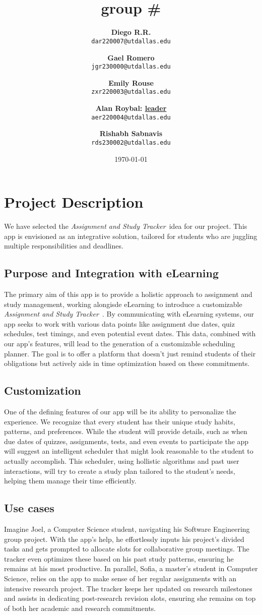 \documentclass[12pt]{article}
\title{\groupname
\\ \small{group} \# \groupnumber}
\author{
    \textbf{Diego R.R.} \\
    \texttt{dar220007@utdallas.edu} \\
    \and 
    \textbf{Gael Romero} \\
    \texttt{jgr230000@utdallas.edu} \\
    \and
    \textbf{Emily Rouse} \\
    \texttt{zxr220003@utdallas.edu} \\
    \and
    \textbf{Alan Roybal: \underline{leader}} \\
    \texttt{aer220004@utdallas.edu} \\
    \and
    \textbf{Rishabh Sabnavis} \\
    \texttt{rds230002@utdallas.edu}
}
\date{\today} %
\newcommand\projectname{\textit{Assignment and Study Tracker\ }}
\begin{document}
\maketitle %

\section{Project Description} 
    We have selected the \projectname idea for our project. This app is envisioned as an integrative solution, tailored for students who are juggling multiple responsibilities and deadlines.

\subsection{Purpose and Integration with eLearning}
    The primary aim of this app is to provide a holistic approach to assignment and study management, working alongisde eLearning to introduce a customizable \projectname. By communicating with eLearning systems, our app seeks to work with various data points like assignment due dates, quiz schedules, test timings, and even potential event dates. This data, combined with our app's features, will lead to the generation of a customizable scheduling planner. The goal is to offer a platform that doesn't just remind students of their obligations but actively aids in time optimization based on these commitments.

\subsection{Customization} 
    One of the defining features of our app will be its ability to personalize the experience. We recognize that every student has their unique study habits, patterns, and preferences. While the student will provide details, such as when due dates of quizzes, assignments, tests, and even events to participate the app will suggest an intelligent scheduler that might look reasonable to the student to actually accomplish. This scheduler, using hollistic algorithms and past user interactions, will try to create a study plan tailored to the student's needs, helping them manage their time efficiently.

\subsection{Use cases}
    Imagine Joel, a Computer Science student, navigating his Software Engineering group project. With the app's help, he effortlessly inputs his project's divided tasks and gets prompted to allocate slots for collaborative group meetings. The tracker even optimizes these based on his past study patterns, ensuring he remains at his most productive. In parallel, Sofia, a master's student in Computer Science, relies on the app to make sense of her regular assignments with an intensive research project. The tracker keeps her updated on research milestones and assists in dedicating post-research revision slots, ensuring she remains on top of both her academic and research commitments.
\end{document}
